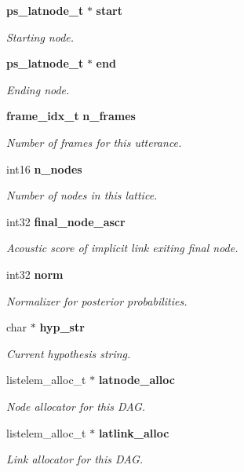 \begin{DoxyCompactItemize}
{\bf ps\+\_\+latnode\+\_\+t} $\ast$ {\bf start}
\begin{DoxyCompactList}\small\item\em Starting node. \end{DoxyCompactList}\item 
{\bf ps\+\_\+latnode\+\_\+t} $\ast$ {\bf end}
\begin{DoxyCompactList}\small\item\em Ending node. \end{DoxyCompactList}\item 
{\bf frame\+\_\+idx\+\_\+t} {\bf n\+\_\+frames}
\begin{DoxyCompactList}\small\item\em Number of frames for this utterance. \end{DoxyCompactList}\item 
int16 {\bf n\+\_\+nodes}
\begin{DoxyCompactList}\small\item\em Number of nodes in this lattice. \end{DoxyCompactList}\item 
int32 {\bf final\+\_\+node\+\_\+ascr}
\begin{DoxyCompactList}\small\item\em Acoustic score of implicit link exiting final node. \end{DoxyCompactList}\item 
int32 {\bf norm}
\begin{DoxyCompactList}\small\item\em Normalizer for posterior probabilities. \end{DoxyCompactList}\item 
char $\ast$ {\bf hyp\+\_\+str}
\begin{DoxyCompactList}\small\item\em Current hypothesis string. \end{DoxyCompactList}\item 
listelem\+\_\+alloc\+\_\+t $\ast$ {\bf latnode\+\_\+alloc}
\begin{DoxyCompactList}\small\item\em Node allocator for this D\+A\+G. \end{DoxyCompactList}\item 
listelem\+\_\+alloc\+\_\+t $\ast$ {\bf latlink\+\_\+alloc}
\begin{DoxyCompactList}\small\item\em Link allocator for this D\+A\+G. \end{DoxyCompactList}\item 

\end{DoxyCompactItemize}
